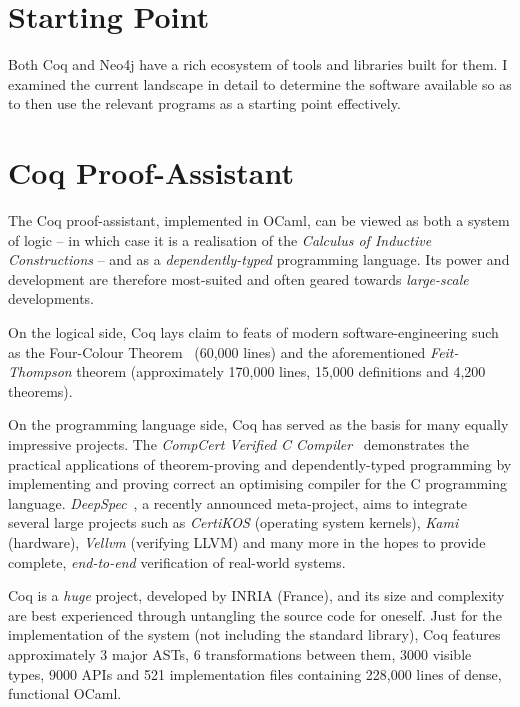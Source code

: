 \section{Starting Point}

Both Coq and Neo4j have a rich ecosystem of tools and libraries built for them.
I examined the current landscape in detail to determine the software available
so as to then use the relevant programs as a starting point effectively.

\section{Coq Proof-Assistant}

The Coq proof-assistant, implemented in OCaml, can be viewed as both a system of
logic -- in which case it is a realisation of the \emph{Calculus of Inductive
Constructions} -- and as a \emph{dependently-typed} programming language. Its
power and development are therefore most-suited and often geared towards
\emph{large-scale} developments.

On the logical side, Coq lays claim to feats of modern software-engineering such
as the Four-Colour Theorem~\cite{gonthier2008formal} (60,000 lines) and the
aforementioned \emph{Feit-Thompson} theorem (approximately 170,000 lines, 15,000
definitions and 4,200 theorems).

On the programming language side, Coq has served as the basis for many equally
impressive projects. The \emph{CompCert Verified C
Compiler}~\cite{leroy2012compcert} demonstrates the practical applications of
theorem-proving and dependently-typed programming by implementing and proving
correct an optimising compiler for the C programming language.
\emph{DeepSpec}~\cite{pierce2016science}, a recently announced meta-project,
aims to integrate several large projects such as \emph{CertiKOS} (operating
system kernels), \emph{Kami} (hardware), \emph{Vellvm} (verifying LLVM) and many
more in the hopes to provide complete, \emph{end-to-end} verification of
real-world systems.

Coq is a \emph{huge} project, developed by INRIA (France), and its size and
complexity are best experienced through untangling the source code for oneself.
Just for the implementation of the system (not including the standard library),
Coq features approximately 3 major ASTs, 6 transformations between them, 3000
visible types, 9000 APIs and 521 implementation files containing 228,000 lines
of dense, functional OCaml.

